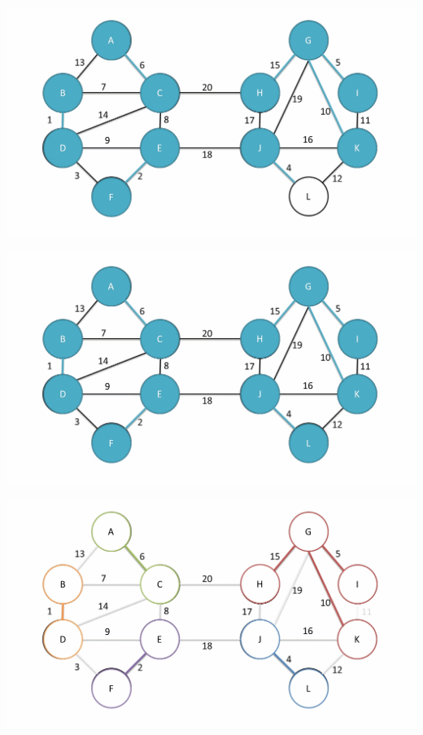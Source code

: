 \documentclass[
	11pt, %
]{beamer}
\begin{document}
\begin{frame}
    \includegraphics[width = 1\textwidth]{baruvka-example/frame_18_delay-1s.png}
\end{frame}
\begin{frame}
    \includegraphics[width = 1\textwidth]{baruvka-example/frame_19_delay-2s.png}
\end{frame}
\begin{frame}
    \includegraphics[width = 1\textwidth]{baruvka-example/frame_20_delay-3s.png}
\end{frame}
\end{document}
